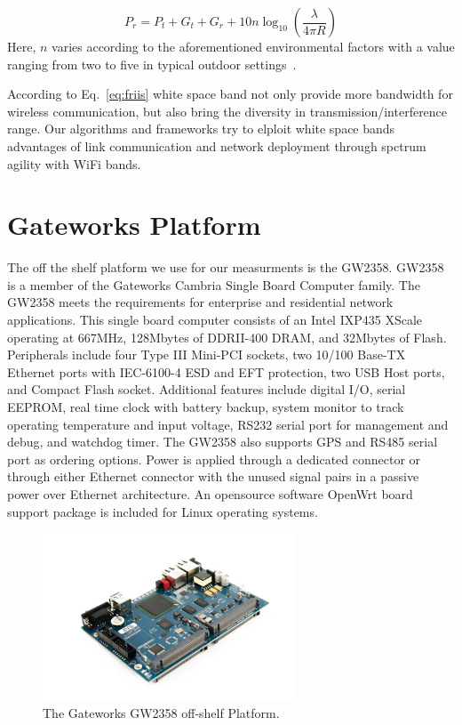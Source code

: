\begin{equation}
\label{eq:friis}
P_r=P_t+G_t+G_r+10n \log_{10}\left( \frac{\lambda}{4\pi R}\right)
\end{equation}
Here, $n$ varies according to the aforementioned environmental 
factors with a value ranging from two to five in typical outdoor 
settings~\cite{rappaport}.

According to Eq.~\ref{eq:friis} white space band not only provide more 
bandwidth for wireless communication, but also bring the diversity in 
transmission/interference range. Our algorithms and frameworks try to 
elploit white space bands advantages of link communication and network 
deployment through spctrum agility with WiFi bands.


\section{Gateworks Platform}

The off the shelf platform we use for our measurments is the GW2358. 
GW2358 is a member of the Gateworks Cambria Single Board Computer family. 
The GW2358 meets the requirements for enterprise and residential network 
applications. This single board computer consists of an Intel IXP435 XScale 
operating at 667MHz, 128Mbytes of DDRII-400 DRAM, and 32Mbytes of Flash. 
Peripherals include four Type III Mini-PCI sockets, two 10/100 Base-TX 
Ethernet ports with IEC-6100-4 ESD and EFT protection, two USB Host ports, 
and Compact Flash socket. Additional features include digital I/O, serial 
EEPROM, real time clock with battery backup, system monitor to track 
operating temperature and input voltage, RS232 serial port for management 
and debug, and watchdog timer. The GW2358 also supports GPS and RS485 
serial port as ordering options. Power is applied through a dedicated 
connector or through either Ethernet connector with the unused signal 
pairs in a passive power over Ethernet architecture. 
An opensource software OpenWrt board support package is included 
for Linux operating systems.


\begin{figure} 
\centering
\includegraphics[width=75mm]{figures/gw2358}
\vspace{-0.1in}
\caption{The Gateworks GW2358 off-shelf Platform.}
\label{fig:gw2358}
\vspace{0.1in}
\end{figure}




